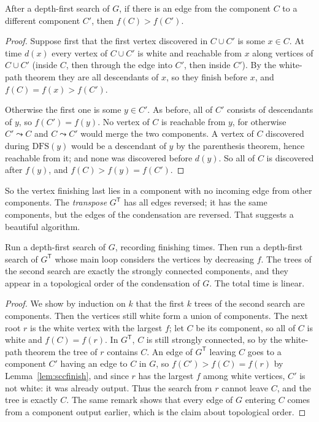 \begin{lemma}\label{lem:sccfinish}
After a depth-first search of $G$, if there is an edge from the component $C$ to a different component $C'$, then $f(C)>f(C')$.
\end{lemma}
\begin{proof}
Suppose first that the first vertex discovered in $C\cup C'$ is some $x\in C$. At time $d(x)$ every vertex of $C\cup C'$ is white and reachable from $x$ along vertices of $C\cup C'$ (inside $C$, then
through the edge into $C'$, then inside $C'$). By the white-path theorem they are all descendants of $x$, so they finish before $x$, and $f(C)=f(x)>f(C')$.

Otherwise the first one is some $y\in C'$. As before, all of $C'$ consists of descendants of $y$, so $f(C')=f(y)$. No vertex of $C$ is reachable from $y$, for otherwise $C'\leadsto C$ and $C\leadsto C'$ would
merge the two components. A vertex of $C$ discovered during $\mathrm{DFS}(y)$ would be a descendant of $y$ by the parenthesis theorem, hence reachable from it; and none was discovered before $d(y)$.
So all of $C$ is discovered after $f(y)$, and $f(C)>f(y)=f(C')$.
\end{proof}

So the vertex finishing last lies in a component with no incoming edge from other components. The \emph{transpose} $G^{\mathsf T}$ has all edges reversed; it has the same components,
but the edges of the condensation are reversed. That suggests a beautiful algorithm.

\begin{theorem}\label{thm:kosaraju}
Run a depth-first search of $G$, recording finishing times. Then run a depth-first search of $G^{\mathsf T}$ whose main loop considers the vertices by decreasing $f$. The trees of the
second search are exactly the strongly connected components, and they appear in a topological order of the condensation of $G$. The total time is linear.
\end{theorem}
\begin{proof}
We show by induction on $k$ that the first $k$ trees of the second search are components. Then the vertices still white form a union of components. The next root $r$ is the white vertex with the largest
$f$; let $C$ be its component, so all of $C$ is white and $f(C)=f(r)$. In $G^{\mathsf T}$, $C$ is still strongly connected, so by the white-path theorem the tree of $r$ contains $C$. An edge of $G^{\mathsf T}$
leaving $C$ goes to a component $C'$ having an edge to $C$ in $G$, so $f(C')>f(C)=f(r)$ by Lemma~\ref{lem:sccfinish}, and since $r$ has the largest $f$ among white vertices, $C'$ is not white: it
was already output. Thus the search from $r$ cannot leave $C$, and the tree is exactly $C$. The same remark shows that every edge of $G$ entering $C$ comes from a component output earlier,
which is the claim about topological order.
\end{proof}

